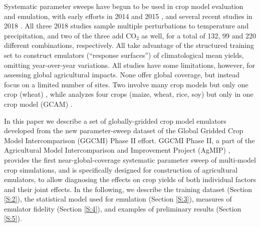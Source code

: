 \documentclass[gmd, manuscript]{copernicus} %
\begin{document}
Systematic parameter sweeps have begun to be used in crop model evaluation and emulation, with early efforts in 2014 and 2015 \citep{ruane2014, Markowski2015, Pirttioja2015}, and several recent studies in 2018 \citep{FRONZEK20182, Snyder2018, RUIZRAMOS2018}. 
All three 2018 studies sample multiple perturbations to temperature and precipitation, and two of the three add CO$_2$ as well, for a total of 132, 99 and 220 different combinations, respectively. 
All take advantage of the structured training set to construct emulators (``response surfaces'') of climatological mean yields, omitting year-over-year variations. 
All studies have some limitations, however, for assessing global agricultural impacts. None offer global coverage, but instead focus on a limited number of sites. Two involve many crop models but only one crop (wheat) \citep{FRONZEK20182,RUIZRAMOS2018}, while \citet{Snyder2018} analyzes four crops (maize, wheat, rice, soy) but only in one crop model (GCAM) \citep{calvin2019}.

In this paper we describe a set of globally-gridded crop model emulators developed from the new parameter-sweep dataset of the Global Gridded Crop Model Intercomparison (GGCMI) Phase II effort. 
GGCMI Phase II, a part of the Agricultural Model Intercomparison and Improvement Project (AgMIP) \citep{ROSENZWEIG2013, Rosenzweig2014}, provides the first near-global-coverage systematic parameter sweep of multi-model crop simulations, and is specifically designed for construction of agricultural emulators,  
to allow diagnosing the effects on crop yields of both individual factors and their joint effects.
In the following, we describe the training dataset (Section \ref{S:2}), the statistical model used for emulation (Section \ref{S:3}), measures of emulator fidelity (Section \ref{S:4}), and examples of preliminary results (Section \ref{S:5}). 


\end{document}
